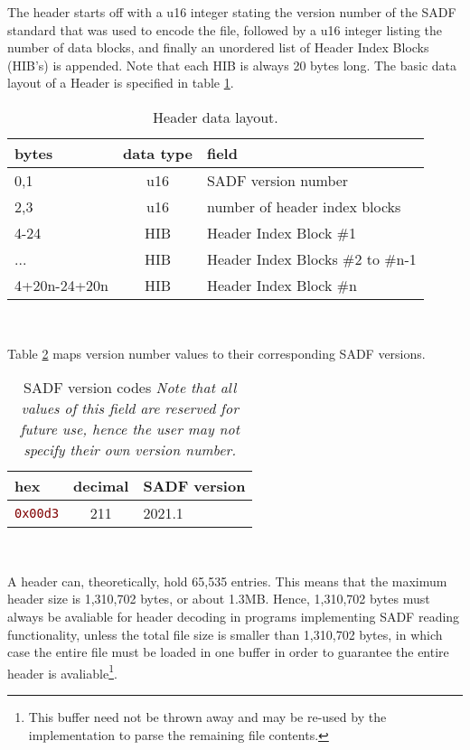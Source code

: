 \documentclass[pagesize=a4]{tufte-book}
\newcommand{\hlred}[1]{\textcolor{Maroon}{#1}}%
\newcommand{\hex}[1]{\hlred{\texttt{#1}}}%
\begin{document}
The header starts off with a u16 integer stating the version number of the SADF standard that was used to encode the file, followed by a u16 integer listing the number of data blocks, and finally an unordered list of Header Index Blocks (HIB's) is appended. Note that each HIB is always 20 bytes long. The basic data layout of a Header is specified in table \ref{tab:header_layout}. 

\begin{table}[ht]
	\centering
	\selectfont
	\begin{tabular}{lcl}
		\toprule
		bytes & data type & field\\
		\midrule
		0,1 & u16 & SADF version number\\
		2,3 & u16 & number of header index blocks\\
		4-24 & HIB & Header Index Block \#1\\
		... & HIB & Header Index Blocks \#2 to \#n-1\\
		4+20n-24+20n & HIB & Header Index Block \#n \\
		\bottomrule
	\end{tabular}
	~\label{tab:header_layout}
	\caption{Header data layout.}	
\end{table}
\vspace{5mm}

Table \ref{tab:sadf_version_codes} maps version number values to their corresponding SADF
versions.

\begin{table}[ht]
	\centering
	\selectfont
	\begin{tabular}{lcl}
		\toprule
		hex & decimal & SADF version\\
		\midrule
		\hex{0x00d3} & 211 & 2021.1\\
		\bottomrule
	\end{tabular}
	~\label{tab:sadf_version_codes}
	\caption[SADF version codes]{SADF version codes\emph{ Note that all values of this field are reserved for future use, hence the user may not specify their own version number.}}
	
\end{table}
\vspace{5mm}

A header can, theoretically, hold 65,535 entries. This means that the maximum header size is 1,310,702 bytes, or about 1.3MB. Hence, 1,310,702 bytes must always be avaliable for header decoding in programs implementing SADF reading functionality, unless the total file size is smaller than 1,310,702 bytes, in which case the entire file must be loaded in one buffer in order to guarantee the entire header is avaliable\footnote{This buffer need not be thrown away and may be re-used by the implementation to parse the remaining file contents.}.
\end{document}
